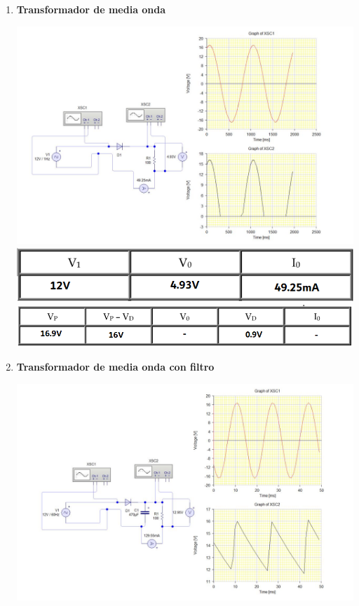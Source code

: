 \documentclass[12pt]{article}
\begin{document}
\begin{itemize}
        \begin{enumerate}
            \item \textbf{Transformador de media onda}
            \begin{center}
                \includegraphics*[scale=0.4]{sim1.jpg}
                \includegraphics*[scale=0.45]{medSim1.png}
                \includegraphics*[scale=0.45]{medSim2.png}
            \end{center}
            \item \textbf{Transformador de media onda con filtro}
            \begin{center}
                \includegraphics*[scale=0.35]{sim2.jpg}

\end{center}
\end{enumerate}
\end{itemize}
\end{document}
